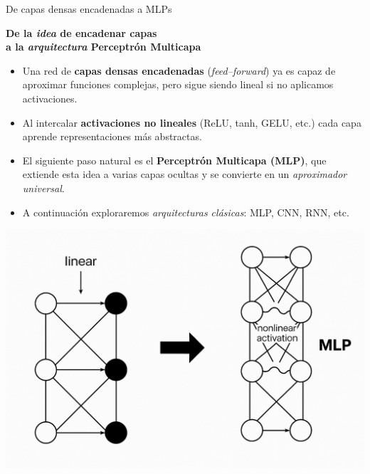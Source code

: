 \documentclass[8pt,spanish]{beamer}
\begin{document}
\begin{frame}[fragile]{De capas densas encadenadas a MLPs}
  \begin{center}
    \large\bfseries
    De la \emph{idea} de encadenar capas\\[0.3em]
    a la \emph{arquitectura} Perceptrón Multicapa
  \end{center}
  \vspace{0.2cm}

  \begin{itemize}
    \item Una red de \textbf{capas densas encadenadas} (\emph{feed--forward}) ya es capaz de aproximar funciones complejas, pero sigue siendo \alert{lineal} si no aplicamos activaciones.

    \item Al intercalar \textbf{activaciones no lineales} (ReLU, tanh, GELU, etc.) cada capa aprende representaciones más abstractas. \\[0.6em]

    \item El siguiente paso natural es el \textbf{Perceptrón Multicapa (MLP)}, que extiende esta idea a varias capas ocultas y se convierte en un \emph{aproximador universal}.

    \item A continuación exploraremos \emph{arquitecturas clásicas}: MLP, CNN, RNN, etc.
  \end{itemize}

  \begin{center}
    \includegraphics[width=.52\textwidth]{dense_To_mlp.png}
  \end{center}
\end{frame}
\end{document}
